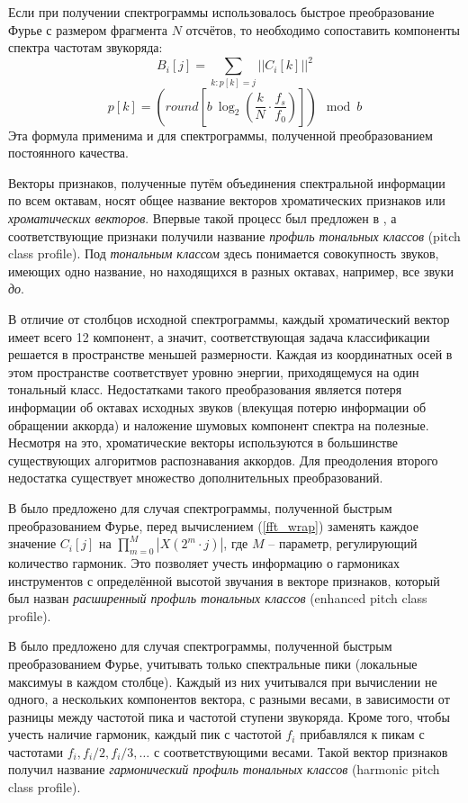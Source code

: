 Если при получении спектрограммы использовалось быстрое преобразование Фурье с
размером фрагмента $N$ отсчётов, то необходимо сопоставить компоненты спектра
частотам звукоряда:
\begin{equation}
B_i[j] = \sum_{k: p[k]=j} ||C_i[k]||^2 \label{fft_wrap}
\end{equation}
$$p[k] = \left(round \left[ b~\log_2 \left( \frac{k}{N} \cdot \frac{f_s}{f_0}
\right) \right] \right) \mod b$$
Эта формула применима и для спектрограммы, полученной преобразованием
постоянного качества.

Векторы признаков, полученные путём объединения спектральной информации по всем
октавам, носят общее название векторов хроматических признаков или
\emph{хроматических векторов}. Впервые такой процесс был предложен в
\cite{Fujishima1999}, а соответствующие признаки получили название
\emph{профиль тональных классов} (pitch class profile). Под \emph{тональным
классом} здесь понимается совокупность звуков, имеющих одно название, но
находящихся в разных октавах, например, все звуки \emph{до}.

В отличие от столбцов исходной спектрограммы, каждый хроматический вектор имеет
всего 12 компонент, а значит, соответствующая задача классификации решается в
пространстве меньшей размерности. Каждая из координатных осей в этом
пространстве соответствует уровню энергии, приходящемуся на один тональный
класс. Недостатками такого преобразования является потеря информации об октавах
исходных звуков (влекущая потерю информации об обращении аккорда) и наложение
шумовых компонент спектра на полезные. Несмотря на это, хроматические векторы
используются в большинстве существующих алгоритмов распознавания аккордов.
Для преодоления второго недостатка существует множество дополнительных
преобразований.

В \cite{Lee2006} было предложено для случая спектрограммы, полученной быстрым
преобразованием Фурье, перед вычислением (\ref{fft_wrap}) заменять каждое
значение $C_i[j]$ на $\prod_{m=0}^M |X(2^m \cdot j)|$, где $M$ -- параметр,
регулирующий количество гармоник. Это позволяет учесть информацию о гармониках
инструментов с определённой высотой звучания в векторе признаков, который был
назван \emph{расширенный профиль тональных классов} (enhanced pitch class
profile).

В \cite{Gomez2006} было предложено для случая спектрограммы, полученной быстрым
преобразованием Фурье, учитывать только спектральные пики (локальные максимуы в
каждом столбце). Каждый из них учитывался при вычислении не одного, а
нескольких компонентов вектора, с разными весами, в зависимости от разницы
между частотой пика и частотой ступени звукоряда. Кроме того, чтобы учесть
наличие гармоник, каждый пик с частотой $f_i$ прибавлялся к пикам с частотами
$f_i, f_i/2, f_i/3, \ldots$ с соответствующими весами. Такой вектор признаков
получил название \emph{гармонический профиль тональных классов} (harmonic
pitch class profile).

